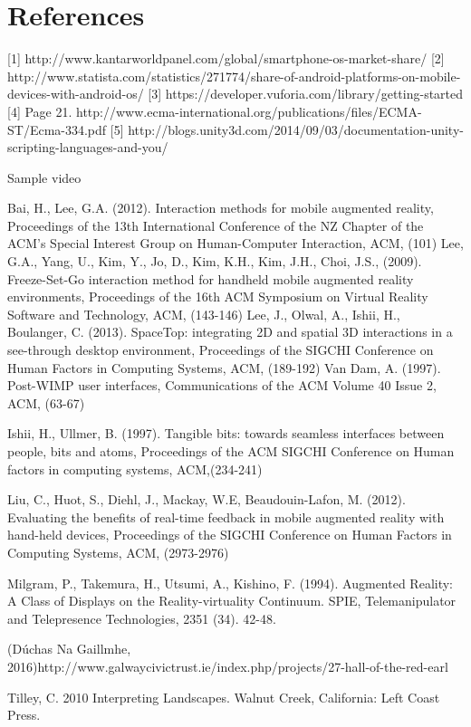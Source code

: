 \chapter{References}
[1] http://www.kantarworldpanel.com/global/smartphone-os-market-share/
[2] http://www.statista.com/statistics/271774/share-of-android-platforms-on-mobile-devices-with-android-os/
[3] https://developer.vuforia.com/library/getting-started
[4] Page 21. http://www.ecma-international.org/publications/files/ECMA-ST/Ecma-334.pdf 
[5] http://blogs.unity3d.com/2014/09/03/documentation-unity-scripting-languages-and-you/

Sample video


Bai, H., Lee, G.A. (2012). Interaction methods for mobile augmented reality, Proceedings of the 13th International Conference of the NZ Chapter of the ACM's Special Interest Group on Human-Computer Interaction, ACM, (101)
Lee, G.A., Yang, U., Kim, Y., Jo, D., Kim, K.H., Kim, J.H., Choi, J.S.,  (2009). Freeze-Set-Go interaction method for handheld mobile augmented reality environments, Proceedings of the 16th ACM Symposium on Virtual Reality Software and Technology, ACM, (143-146)
Lee, J., Olwal, A., Ishii, H., Boulanger, C. (2013). SpaceTop: integrating 2D and spatial 3D interactions in a see-through desktop environment, Proceedings of the SIGCHI Conference on Human Factors in Computing Systems, ACM, (189-192)
Van Dam, A. (1997). Post-WIMP user interfaces, Communications of the ACM Volume 40 Issue 2, ACM, (63-67)

Ishii, H., Ullmer, B. (1997). Tangible bits: towards seamless interfaces between people, bits and atoms, Proceedings of the ACM SIGCHI Conference on Human factors in computing systems, ACM,(234-241)

Liu, C., Huot, S., Diehl, J., Mackay, W.E, Beaudouin-Lafon, M.  (2012). Evaluating the benefits of real-time feedback in mobile augmented reality with hand-held devices, Proceedings of the SIGCHI Conference on Human Factors in Computing Systems, ACM, (2973-2976)

Milgram, P., Takemura, H., Utsumi, A., Kishino, F. (1994). Augmented Reality: A Class of Displays on the Reality-virtuality Continuum. SPIE, Telemanipulator and Telepresence Technologies, 2351 (34). 42-48.

(Dúchas Na Gaillmhe, 2016)http://www.galwaycivictrust.ie/index.php/projects/27-hall-of-the-red-earl

Tilley, C. 2010 Interpreting Landscapes. Walnut Creek, California: Left Coast Press.